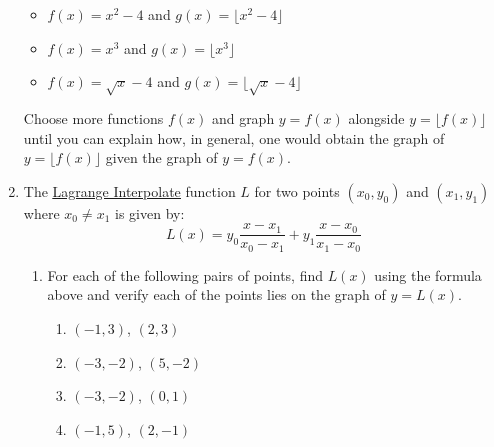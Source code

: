 \documentclass{ximera}
\begin{document}
\begin{enumerate}
\begin{multicols}{2}
\begin{itemize}
\item  $f(x) = x^2-4$ and $g(x) = \lfloor x^2 -4\rfloor$

\end{itemize}

\end{multicols}


\begin{multicols}{2}

\begin{itemize}

\item  $f(x) = x^3$ and $g(x) = \lfloor x^3 \rfloor$

\item  $f(x) = \sqrt{x}-4$ and $g(x) = \lfloor \sqrt{x} -4  \rfloor$

\end{itemize}

\end{multicols}

Choose more functions $f(x)$ and graph $y = f(x)$ alongside $y = \lfloor f(x) \rfloor$ until you can explain how, in general, one would obtain the graph of $y = \lfloor f(x) \rfloor$ given the graph of $y = f(x)$.


\item \label{LagrangeLinearExercise} The \href{https://en.wikipedia.org/wiki/Lagrange_polynomial}{\underline{Lagrange Interpolate}} function $L$ for two points $(x_{0}, y_{0})$ and $(x_{1}, y_{1})$ where $x_{0} \neq x_{1}$  is given by: \[L(x) = y_{0}  \dfrac{x - x_{1}}{x_{0} - x_{1}}+ y_{1}\dfrac{x - x_{0}}{x_{1} - x_{0}}\]

\begin{enumerate}

\item For each of the following pairs of points,  find  $L(x)$ using the formula above and verify each of the points lies on the graph of $y = L(x)$.

\begin{multicols}{4}

\begin{enumerate}

\item  $(-1,3)$, $(2,3)$

\item  $(-3,-2)$,  $(5,-2)$

\item  $(-3,-2)$, $(0,1)$

\item  $(-1,5)$, $(2,-1)$


\end{enumerate}
\end{multicols}
\end{enumerate}
\end{enumerate}
\end{document}
